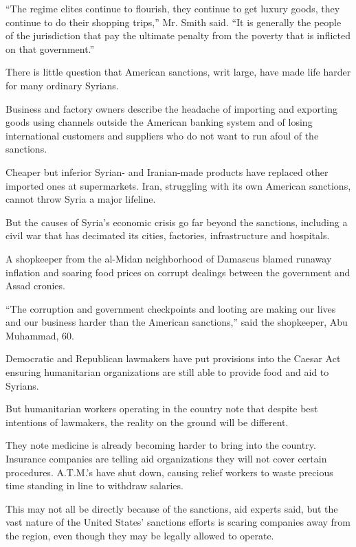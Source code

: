 ``The regime elites continue to flourish, they continue to get luxury
goods, they continue to do their shopping trips,'' Mr. Smith said. ``It
is generally the people of the jurisdiction that pay the ultimate
penalty from the poverty that is inflicted on that government.''

There is little question that American sanctions, writ large, have made
life harder for many ordinary Syrians.

Business and factory owners describe the headache of importing and
exporting goods using channels outside the American banking system and
of losing international customers and suppliers who do not want to run
afoul of the sanctions.

Cheaper but inferior Syrian- and Iranian-made products have replaced
other imported ones at supermarkets. Iran, struggling with its own
American sanctions, cannot throw Syria a major lifeline.

But the causes of Syria's economic crisis go far beyond the sanctions,
including a civil war that has decimated its cities, factories,
infrastructure and hospitals.

A shopkeeper from the al-Midan neighborhood of Damascus blamed runaway
inflation and soaring food prices on corrupt dealings between the
government and Assad cronies.

``The corruption and government checkpoints and looting are making our
lives and our business harder than the American sanctions,'' said the
shopkeeper, Abu Muhammad, 60.

Democratic and Republican lawmakers have put provisions into the Caesar
Act ensuring humanitarian organizations are still able to provide food
and aid to Syrians.

But humanitarian workers operating in the country note that despite best
intentions of lawmakers, the reality on the ground will be different.

They note medicine is already becoming harder to bring into the country.
Insurance companies are telling aid organizations they will not cover
certain procedures. A.T.M.'s have shut down, causing relief workers to
waste precious time standing in line to withdraw salaries.

This may not all be directly because of the sanctions, aid experts said,
but the vast nature of the United States' sanctions efforts is scaring
companies away from the region, even though they may be legally allowed
to operate.

\href{https://www.nytimes3xbfgragh.onion/news-event/coronavirus?action=click\&pgtype=Article\&state=default\&region=MAIN_CONTENT_3\&context=storylines_faq}{}

